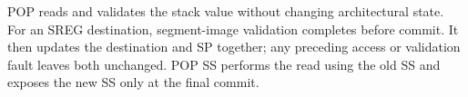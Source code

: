 POP reads and validates the stack value without changing architectural state. For an SREG destination, segment-image validation completes before commit. It then updates the destination and SP together; any preceding access or validation fault leaves both unchanged. POP SS performs the read using the old SS and exposes the new SS only at the final commit.

